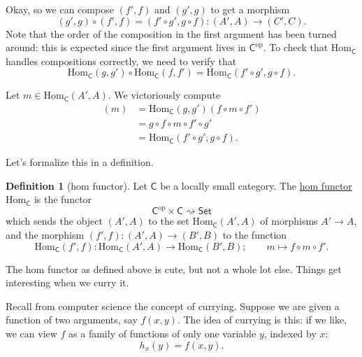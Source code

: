 \documentclass[a4paper]{report}
\newcommand{\defn}[1]{\ul{#1}}
\newcommand{\Hom}{\mathrm{Hom}}
\theoremstyle{definition}
\newtheorem{definition}{Definition}[section]
\theoremstyle{plain}
\theoremstyle{remark}
\begin{document}
Okay, so we can compose $(f', f)$ and $(g', g)$ to get a morphism 
\begin{equation*}
  (g', g) \circ (f', f) = (f' \circ g', g \circ f)\colon (A', A) \to (C', C).
\end{equation*}
Note that the order of the composition in the first argument has been turned around: this is expected since the first argument lives in $\mathsf{C}^{\mathrm{op}}$. To check that $\Hom_{\mathsf{C}}$ handles compositions correctly, we need to verify that 
\begin{equation*}
  \Hom_{\mathsf{C}}(g, g') \circ \Hom_{\mathsf{C}}(f, f') = \Hom_{\mathsf{C}}(f' \circ g', g \circ f).
\end{equation*}

Let $m \in \Hom_{\mathsf{C}}(A', A)$. We victoriously compute
\begin{align*}
  [\Hom_{\mathsf{C}}(g, g') \circ \Hom_{\mathsf{C}}(f, f')](m) &= \Hom_{\mathsf{C}}(g, g')(f \circ m \circ f') \\
  &= g \circ f \circ m \circ f' \circ g' \\
  &= \Hom_{\mathsf{C}}(f' \circ g', g \circ f).
\end{align*}

Let's formalize this in a definition.
\begin{definition}[hom functor]
  \label{def:homfunctor}
  Let $\mathsf{C}$ be a locally small category. The \defn{hom functor} $\Hom_{\mathsf{C}}$ is the functor 
  \begin{equation*}
    \mathsf{C}^{\mathrm{op}} \times \mathsf{C} \rightsquigarrow \mathsf{Set}
  \end{equation*}
  which sends the object $(A', A)$ to the set $\Hom_{\mathsf{C}}(A', A)$ of morphisms $A' \to A$, and the morphism $(f', f)\colon (A', A) \to (B', B)$ to the function
  \begin{equation*}
    \Hom_{\mathsf{C}}(f', f)\colon \Hom_{\mathsf{C}}(A', A) \to \Hom_{\mathsf{C}}(B', B);\qquad m \mapsto f \circ m \circ f'.
  \end{equation*}
\end{definition}

The hom functor as defined above is cute, but not a whole lot else. Things get interesting when we curry it.

Recall from computer science the concept of currying. Suppose we are given a function of two arguments, say $f(x, y)$. The idea of currying is this: if we like, we can view $f$ as a family of functions of only one variable $y$, indexed by $x$:
\begin{equation*}
  h_{x}(y) = f(x, y).
\end{equation*}
\end{document}
